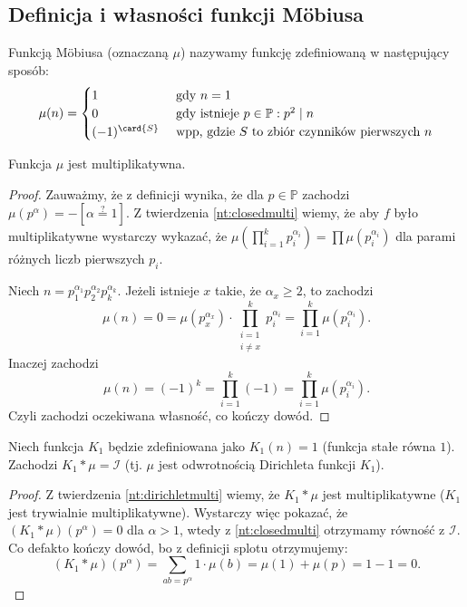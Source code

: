 \subsection{Definicja i własności funkcji Möbiusa}
\begin{definition}
	Funkcją Möbiusa (oznaczaną $\mu$) nazywamy funkcję
	zdefiniowaną w następujący sposób:
	\begin{equation*}
		\mu(n) = \begin{cases}
			1             & \text{ gdy } n = 1                                      \\
			0             & \text{ gdy istnieje } p \in \mathbb P: p^2 \mid n       \\
			(-1)^\card{S} & \text{ wpp, gdzie $S$ to zbiór czynników pierwszych } n
		\end{cases}
	\end{equation*}
\end{definition}

\begin{fact}
	Funkcja $\mu$ jest multiplikatywna.
\end{fact}
\begin{proof}
	Zauważmy, że z definicji wynika, że dla $p \in \mathbb P$ zachodzi
	$\mu(p^{\alpha}) = -[\alpha \stackrel{?}{=} 1]$.
	Z twierdzenia \ref{nt:closedmulti}
	wiemy, że aby $f$ było multiplikatywne wystarczy wykazać, że
	$\mu(\prod_{i=1}^{k} p_i^{\alpha_i}) = \prod \mu(p_i^{\alpha_i})$
	dla parami różnych liczb pierwszych $p_i$.

	Niech $n = p_1^{\alpha_1}p_2^{\alpha_2}p_k^{\alpha_k}$.
	Jeżeli istnieje $x$ takie, że $\alpha_x \geq 2$, to
	zachodzi $$\mu(n) = 0 = \mu(p_x^{\alpha_x}) \cdot \prod_{\substack{i = 1 \\ i \neq x}}^k p_i^{\alpha_i} = \prod_{i=1}^{k} \mu(p_i^{\alpha_i}).$$
	Inaczej zachodzi $$\mu(n) = (-1)^{k} = \prod_{i=1}^{k} (-1) = \prod_{i=1}^{k} \mu(p_i^{\alpha_i}).$$
	Czyli zachodzi oczekiwana własność, co kończy dowód.
\end{proof}

\begin{theorem}
	Niech funkcja $K_1$ będzie zdefiniowana jako $K_1(n) = 1$
	(funkcja stałe równa $1$). Zachodzi $K_1 * \mu = \mathcal I$
	(tj. $\mu$ jest odwrotnością Dirichleta funkcji $K_1$).
\end{theorem}
\begin{proof}
	Z twierdzenia \ref{nt:dirichletmulti}
	wiemy, że $K_1 * \mu$ jest multiplikatywne ($K_1$ jest trywialnie multiplikatywne).
	Wystarczy więc pokazać, że $(K_1 * \mu)(p^\alpha) = 0$ dla $\alpha > 1$, wtedy z \ref{nt:closedmulti}
	otrzymamy równość z $\mathcal I$. Co defakto kończy dowód, bo z definicji splotu otrzymujemy:
	$$(K_1 * \mu)(p^\alpha) = \sum_{ab = p^\alpha} 1 \cdot \mu(b) = \mu(1) + \mu(p) = 1 - 1 = 0.$$
\end{proof}

